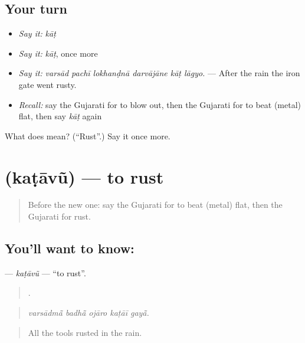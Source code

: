 \subsection*{Your turn}
\begin{itemize}
\raggedright
  \item \emph{Say it:} \emph{kāṭ}
  \item \emph{Say it:} \emph{kāṭ}, once more
  \item \emph{Say it:} \emph{varsād pachī lokhanḍnā darvājāne kāṭ lāgyo.} — After the rain the iron gate went rusty.
  \item \emph{Recall:} say the Gujarati for to blow out, then the Gujarati for to beat (metal) flat, then say \emph{kāṭ} again
\end{itemize}

\begin{tcolorbox}[breakable,colback=teal!4,colframe=teal!35!black,title={Before you move on}]
What does  mean? (\textquotedblleft{}Rust\textquotedblright{}.) Say it once more.
\end{tcolorbox}
\section[\texorpdfstring{\gu{કટાવું} (kaṭāvũ)}{કટાવું (kaṭāvũ)}]{ (kaṭāvũ) — to rust}

\label{lesson:GU-C509-katavu}



\begin{quote}
Before the new one: say the Gujarati for to beat (metal) flat, then the Gujarati for rust.
\end{quote}

\subsection*{You'll want to know: }
\textbf{} — \emph{kaṭāvũ} — \textquotedblleft{}to rust\textquotedblright{}.

\begin{quote}
    .
\end{quote}

\begin{quote}
\emph{varsādmā̃ badhā̃ ojāro kaṭāī gayā̃.}
\end{quote}

\begin{quote}
All the tools rusted in the rain.
\end{quote}

